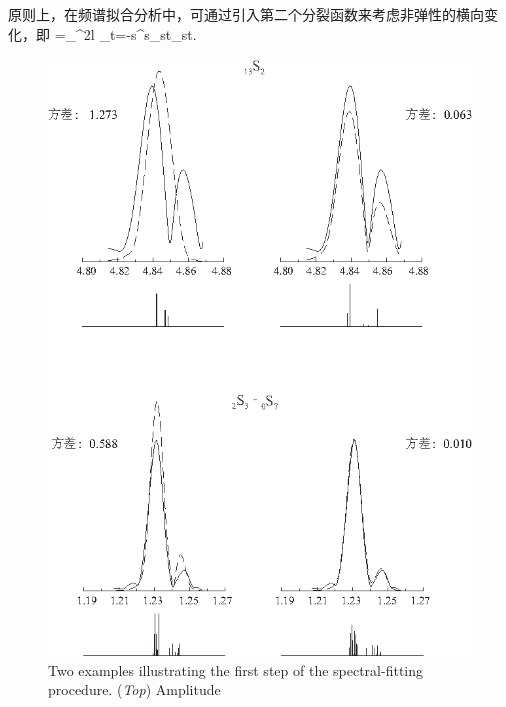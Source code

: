 原则上，在频谱拟合分析中，可通过引入第二个分裂函数来考虑非弹性的横向变化，即
\eq
\psi=\sum_{}^{2l}
\sum_{t=-s}^s\psi_{st}\sY_{st}.
\label{14.splitfcn2}
\en

\begin{figure}[!t]
\begin{center}
\includegraphics{../figures/chap14/fig08.eps}
\end{center}
\caption[inifin]{\label{fig:14.inifin}
\iffalse
Two examples illustrating the first step of the
spectral-fitting procedure. ({\em Top\/}) Amplitude
}
\end{figure}
